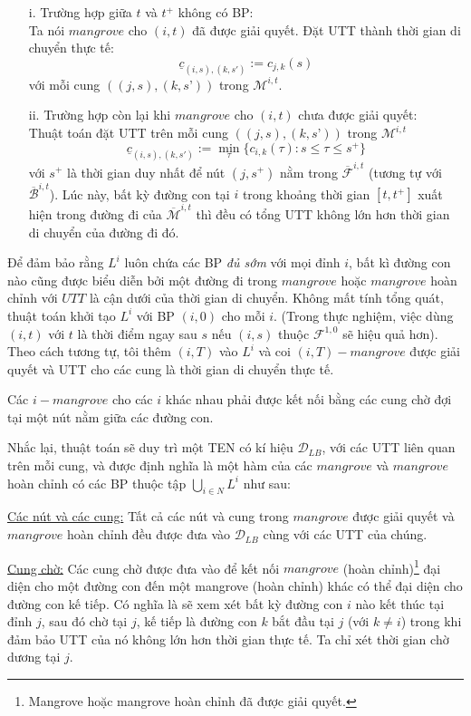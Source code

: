 \documentclass[../main.tex]{subfiles}
\begin{document}
\begin{itemize}
\tightlist
\item[i.]
  Trường hợp giữa \(t\) và \(t^+\) không có BP: \\
  Ta nói
  \(mangrove\) cho \((i, t)\) đã được giải quyết. Đặt UTT thành thời
  gian di chuyển thực tế:
  \[\underline c_{(i, s), (k, s')}:=c_{j, k}(s)\] với mỗi cung
  \(((j,s),(k,s’))\) trong \(\mathcal M^{i,t}\).
\item[ii.]
  Trường hợp còn lại khi \(mangrove\) cho \((i, t)\) chưa được giải
  quyết: \\
  Thuật toán đặt UTT trên mỗi cung \(((j, s), (k, s’))\) trong
  \(\mathcal M^{i,t}\)
  \[\underline c_{(i, s), (k, s')}:=\min_\tau\{c_{i, k}(\tau):s\le \tau \le s^+\}\]
  với \(s^+\) là thời gian duy nhất để nút \((j, s^+)\) nằm trong
  \(\mathcal{\overline{F}}^{i,t}\) (tương tự với \(\mathcal{\overline{B}}^{i,t}\)).
  Lúc này, bất kỳ đường con tại \(i\) trong khoảng thời gian \([t,t^+]\)
  xuất hiện trong đường đi của \(\overline{\mathcal M}^{i,t}\) thì đều có
  tổng UTT không lớn hơn thời gian di chuyển của đường đi đó.
\end{itemize}

Để đảm bảo rằng \(L^i\) luôn chứa các BP \emph{đủ sớm} với mọi
đỉnh \(i\), bất kì đường con nào cũng được biểu diễn bởi một đường đi
trong \(mangrove\) hoặc \(mangrove\) hoàn chỉnh với \(UTT\) là cận dưới
của thời gian di chuyển. Không mất tính tổng quát, thuật toán khởi tạo
\(L^i\) với BP \((i, 0)\) cho mỗi \(i\). (Trong thực nghiệm, việc
dùng \((i, t)\) với \(t\) là thời điểm ngay sau \(s\) nếu \((i, s)\)
thuộc \(\mathcal F^{1,0}\) sẽ hiệu quả hơn). Theo cách tương tự, tôi thêm
\((i, T)\) vào \(L^i\) và coi \((i, T)-mangrove\) được giải quyết và UTT
cho các cung là thời gian di chuyển thực tế.

Các \(i-mangrove\) cho các \(i\) khác nhau phải được kết nối bằng các
cung chờ đợi tại một nút nằm giữa các đường con.

Nhắc lại, thuật toán sẽ duy trì một TEN có kí hiệu \(\mathcal D_{LB}\),
với các UTT liên quan trên mỗi cung, và được định nghĩa là một hàm của
các \(mangrove\) và \(mangrove\) hoàn chỉnh có các BP thuộc tập
\(\bigcup _{i\in N} L^i\) như sau:

\underline{Các nút và các cung:} Tất cả các nút và cung trong \(mangrove\) được giải
quyết và \(mangrove\) hoàn chỉnh đều được đưa vào \(\mathcal D_{LB}\)
cùng với các UTT của chúng.

\underline{Cung chờ:} Các cung chờ được đưa vào để kết nối \(mangrove\) (hoàn
chỉnh)\footnote{Mangrove hoặc mangrove hoàn chỉnh đã được giải quyết.}
đại diện cho một đường con đến một mangrove (hoàn chỉnh) khác có thể đại
diện cho đường con kế tiếp. Có nghĩa là sẽ xem xét bất kỳ đường con
\(i\) nào kết thúc tại đỉnh \(j\), sau đó chờ tại \(j\), kế tiếp là
đường con \(k\) bắt đầu tại \(j\) (với \(k\neq i\)) trong khi đảm bảo
UTT của nó không lớn hơn thời gian thực tế. Ta chỉ xét thời gian chờ
dương tại \(j\).
\end{document}
